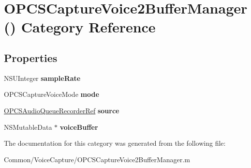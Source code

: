 \hypertarget{category_o_p_c_s_capture_voice2_buffer_manager_07_08}{}\section{O\+P\+C\+S\+Capture\+Voice2\+Buffer\+Manager() Category Reference}
\label{category_o_p_c_s_capture_voice2_buffer_manager_07_08}
\subsection*{Properties}
\begin{DoxyCompactItemize}
\item 
\hypertarget{category_o_p_c_s_capture_voice2_buffer_manager_07_08_aa968f275e12a957632fc473d7fc6d569}{}\label{category_o_p_c_s_capture_voice2_buffer_manager_07_08_aa968f275e12a957632fc473d7fc6d569} 
N\+S\+U\+Integer {\bfseries sample\+Rate}
\item 
\hypertarget{category_o_p_c_s_capture_voice2_buffer_manager_07_08_a081238b056076794f12704a3488ed3a6}{}\label{category_o_p_c_s_capture_voice2_buffer_manager_07_08_a081238b056076794f12704a3488ed3a6} 
O\+P\+C\+S\+Capture\+Voice\+Mode {\bfseries mode}
\item 
\hypertarget{category_o_p_c_s_capture_voice2_buffer_manager_07_08_a96c01ea4a4c999a1c7d48405e0f3dc31}{}\label{category_o_p_c_s_capture_voice2_buffer_manager_07_08_a96c01ea4a4c999a1c7d48405e0f3dc31} 
\hyperlink{struct_o_p_c_s_audio_queue_recorder}{O\+P\+C\+S\+Audio\+Queue\+Recorder\+Ref} {\bfseries source}
\item 
\hypertarget{category_o_p_c_s_capture_voice2_buffer_manager_07_08_a1d9e0b27e13f66e27c1a3ec4f091b879}{}\label{category_o_p_c_s_capture_voice2_buffer_manager_07_08_a1d9e0b27e13f66e27c1a3ec4f091b879} 
N\+S\+Mutable\+Data $\ast$ {\bfseries voice\+Buffer}
\end{DoxyCompactItemize}


The documentation for this category was generated from the following file\+:\begin{DoxyCompactItemize}
\item 
Common/\+Voice\+Capture/O\+P\+C\+S\+Capture\+Voice2\+Buffer\+Manager.\+m\end{DoxyCompactItemize}
